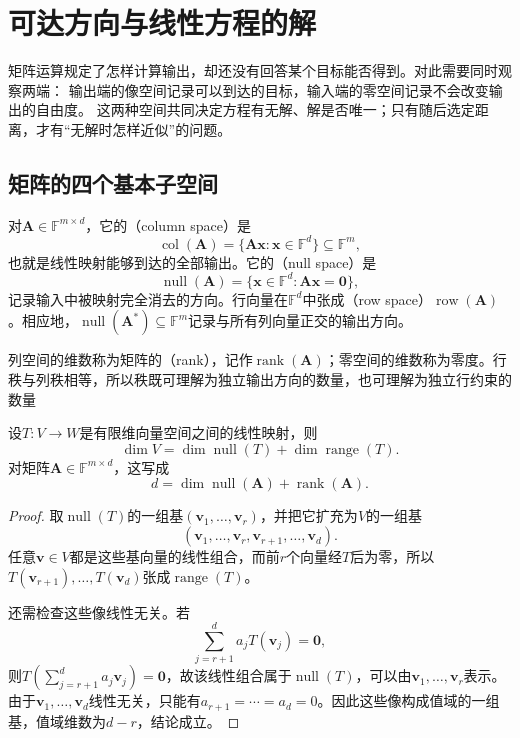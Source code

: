\section{可达方向与线性方程的解}
\label{sec:linear-algebra-reachability-solvability}

矩阵运算规定了怎样计算输出，却还没有回答某个目标能否得到。对此需要同时观察两端：
输出端的像空间记录可以到达的目标，输入端的零空间记录不会改变输出的自由度。
这两种空间共同决定方程有无解、解是否唯一；只有随后选定距离，才有“无解时怎样近似”的问题。

\subsection{矩阵的四个基本子空间}

对$\bm{A}\in\mathbb{F}^{m\times d}$，它的（column space）是
\[
  \operatorname{col}(\bm{A})
  =
  \{\bm{A}\bm{x}:\bm{x}\in\mathbb{F}^d\}
  \subseteq\mathbb{F}^m,
\]
也就是线性映射能够到达的全部输出。它的（null space）是
\[
  \operatorname{null}(\bm{A})
  =
  \{\bm{x}\in\mathbb{F}^d:\bm{A}\bm{x}=\bm{0}\},
\]
记录输入中被映射完全消去的方向。行向量在$\mathbb{F}^d$中张成（row space）$\operatorname{row}(\bm{A})$。相应地，$\operatorname{null}(\bm{A}^{*})\subseteq\mathbb{F}^m$记录与所有列向量正交的输出方向。

列空间的维数称为矩阵的（rank），记作$\operatorname{rank}(\bm{A})$；零空间的维数称为零度。行秩与列秩相等，所以秩既可理解为独立输出方向的数量，也可理解为独立行约束的数量

\begin{theorem}[秩零度定理]
\label{thm:linear-algebra-rank-nullity}
设$T:V\to W$是有限维向量空间之间的线性映射，则
\[
  \dim V
  =
  \dim\operatorname{null}(T)
  +
  \dim\operatorname{range}(T).
\]
对矩阵$\bm{A}\in\mathbb{F}^{m\times d}$，这写成
\[
  d
  =
  \dim\operatorname{null}(\bm{A})
  +
  \operatorname{rank}(\bm{A}).
\]
\end{theorem}

\begin{proof}
取$\operatorname{null}(T)$的一组基$(\bm{v}_1,\ldots,\bm{v}_r)$，并把它扩充为$V$的一组基
\[
  (\bm{v}_1,\ldots,\bm{v}_r,
   \bm{v}_{r+1},\ldots,\bm{v}_d).
\]
任意$\bm{v}\in V$都是这些基向量的线性组合，而前$r$个向量经$T$后为零，所以$T(\bm{v}_{r+1}),\ldots,T(\bm{v}_d)$张成$\operatorname{range}(T)$。

还需检查这些像线性无关。若
\[
  \sum_{j=r+1}^{d}a_jT(\bm{v}_j)=\bm{0},
\]
则$T(\sum_{j=r+1}^{d}a_j\bm{v}_j)=\bm{0}$，故该线性组合属于$\operatorname{null}(T)$，可以由$\bm{v}_1,\ldots,\bm{v}_r$表示。由于$\bm{v}_1,\ldots,\bm{v}_d$线性无关，只能有$a_{r+1}=\cdots=a_d=0$。因此这些像构成值域的一组基，值域维数为$d-r$，结论成立。
\end{proof}

